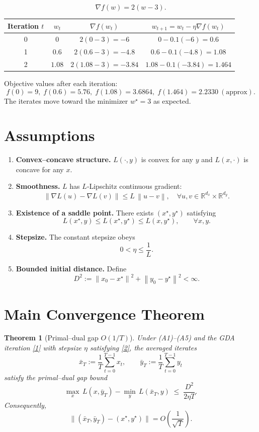 \documentclass{article}
\newtheorem{theorem}{Theorem}
\newcommand{\norm}[1]{\left\lVert#1\right\rVert}
\begin{document}
\[
\nabla f(w)=2(w-3).
\]

\begin{center}
\begin{tabular}{c|c|c|c}
Iteration $t$ & $w_t$ & $\nabla f(w_t)$ & $w_{t+1}=w_t-\eta\nabla f(w_t)$\\\hline
0 & $0$ & $2(0-3)=-6$ & $0-0.1(-6)=0.6$\\
1 & $0.6$ & $2(0.6-3)=-4.8$ & $0.6-0.1(-4.8)=1.08$\\
2 & $1.08$ & $2(1.08-3)=-3.84$ & $1.08-0.1(-3.84)=1.464$\\
\end{tabular}
\end{center}

Objective values after each iteration:
\[
f(0)=9,\; f(0.6)=5.76,\; f(1.08)=3.6864,\; f(1.464)=2.2330\ (\text{approx}).
\]
The iterates move toward the minimizer $w^\star=3$ as expected.

\newpage
\section*{Assumptions}
\begin{enumerate}
\item[(A1)] \textbf{Convex–concave structure.} $L(\cdot ,y)$ is convex for any $y$ and $L(x,\cdot )$ is concave for any $x$.
\item[(A2)] \textbf{Smoothness.} $L$ has $L$‑Lipschitz continuous gradient:
\[
\norm{\nabla L(u)-\nabla L(v)}\le L\,\norm{u-v},
\quad \forall u,v\in\mathbb{R}^{d_x}\times\mathbb{R}^{d_y}.
\]
\item[(A3)] \textbf{Existence of a saddle point.} There exists $(x^\star ,y^\star)$ satisfying
\[
L(x^\star ,y)\le L(x^\star ,y^\star)\le L(x,y^\star),\qquad\forall x,y.
\]
\item[(A4)] \textbf{Stepsize.} The constant stepsize obeys
\[
0<\eta\le \frac{1}{L}.
\tag{2}
\]
\item[(A5)] \textbf{Bounded initial distance.} Define
\[
D^2:=\norm{x_0-x^\star}^2+\norm{y_0-y^\star}^2<\infty .
\]
\end{enumerate}

\section*{Main Convergence Theorem}
\begin{theorem}[Primal–dual gap $O(1/T)$]\label{thm:gap}
Under (A1)–(A5) and the GDA iteration \eqref{1} with stepsize $\eta$ satisfying \eqref{2}, the averaged iterates
\[
\bar{x}_T:=\frac{1}{T}\sum_{t=0}^{T-1}x_t,\qquad
\bar{y}_T:=\frac{1}{T}\sum_{t=0}^{T-1}y_t
\]
satisfy the \emph{primal–dual gap bound}
\[
\max_{x}\,L(x,\bar{y}_T)-\min_{y}\,L(\bar{x}_T,y)
\;\le\;
\frac{D^2}{2\eta T}.
\tag{3}
\]
Consequently,
\[
\bigl\|(\bar{x}_T,\bar{y}_T)-(x^\star ,y^\star)\bigr\|=O\!\left(\frac{1}{\sqrt{T}}\right).
\]
\end{theorem}
\end{document}
